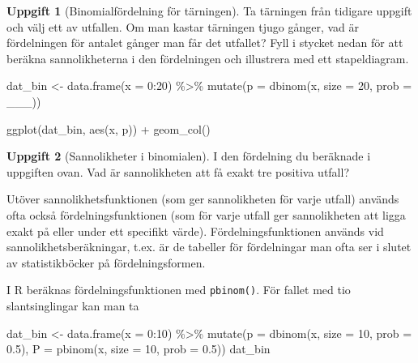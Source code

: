 \documentclass[
]{book}
\newenvironment{Shaded}{\begin{snugshade}}{\end{snugshade}}
\newcommand{\AttributeTok}[1]{\textcolor[rgb]{0.77,0.63,0.00}{#1}}
\newcommand{\DecValTok}[1]{\textcolor[rgb]{0.00,0.00,0.81}{#1}}
\newcommand{\FloatTok}[1]{\textcolor[rgb]{0.00,0.00,0.81}{#1}}
\newcommand{\FunctionTok}[1]{\textcolor[rgb]{0.00,0.00,0.00}{#1}}
\newcommand{\NormalTok}[1]{#1}
\newcommand{\OtherTok}[1]{\textcolor[rgb]{0.56,0.35,0.01}{#1}}
\newcommand{\SpecialCharTok}[1]{\textcolor[rgb]{0.00,0.00,0.00}{#1}}
\theoremstyle{definition}
\theoremstyle{definition}
\theoremstyle{definition}
\newtheorem{exercise}{Uppgift}[chapter]
\theoremstyle{definition}
\theoremstyle{remark}
\begin{document}
\begin{exercise}[Binomialfördelning för tärningen]

Ta tärningen från tidigare uppgift och välj ett av utfallen. Om man kastar tärningen tjugo gånger, vad är fördelningen för antalet gånger man får det utfallet? Fyll i stycket nedan för att beräkna sannolikheterna i den fördelningen och illustrera med ett stapeldiagram.

\begin{Shaded}
\begin{Highlighting}[]
\NormalTok{dat\_bin }\OtherTok{\textless{}{-}} \FunctionTok{data.frame}\NormalTok{(}\AttributeTok{x =} \DecValTok{0}\SpecialCharTok{:}\DecValTok{20}\NormalTok{) }\SpecialCharTok{\%\textgreater{}\%} 
  \FunctionTok{mutate}\NormalTok{(}\AttributeTok{p =} \FunctionTok{dbinom}\NormalTok{(x, }\AttributeTok{size =} \DecValTok{20}\NormalTok{, }\AttributeTok{prob =}\NormalTok{ \_\_\_))}

\FunctionTok{ggplot}\NormalTok{(dat\_bin, }\FunctionTok{aes}\NormalTok{(x, p)) }\SpecialCharTok{+} \FunctionTok{geom\_col}\NormalTok{()}
\end{Highlighting}
\end{Shaded}

\end{exercise}

\begin{exercise}[Sannolikheter i binomialen]
I den fördelning du beräknade i uppgiften ovan. Vad är sannolikheten att få exakt tre positiva utfall?
\end{exercise}

Utöver sannolikhetsfunktionen (som ger sannolikheten för varje utfall) används ofta också fördelningsfunktionen (som för varje utfall ger sannolikheten att ligga exakt på eller under ett specifikt värde). Fördelningsfunktionen används vid sannolikhetsberäkningar, t.ex. är de tabeller för fördelningar man ofta ser i slutet av statistikböcker på fördelningsformen.

I R beräknas fördelningsfunktionen med \texttt{pbinom()}. För fallet med tio slantsinglingar kan man ta

\begin{Shaded}
\begin{Highlighting}[]
\NormalTok{dat\_bin }\OtherTok{\textless{}{-}} \FunctionTok{data.frame}\NormalTok{(}\AttributeTok{x =} \DecValTok{0}\SpecialCharTok{:}\DecValTok{10}\NormalTok{) }\SpecialCharTok{\%\textgreater{}\%} 
  \FunctionTok{mutate}\NormalTok{(}\AttributeTok{p =} \FunctionTok{dbinom}\NormalTok{(x, }\AttributeTok{size =} \DecValTok{10}\NormalTok{, }\AttributeTok{prob =} \FloatTok{0.5}\NormalTok{),}
         \AttributeTok{P =} \FunctionTok{pbinom}\NormalTok{(x, }\AttributeTok{size =} \DecValTok{10}\NormalTok{, }\AttributeTok{prob =} \FloatTok{0.5}\NormalTok{))}
\NormalTok{dat\_bin}
\end{Highlighting}
\end{Shaded}
\end{document}
